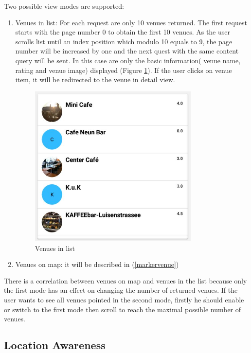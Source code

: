 Two possible view modes are supported:
 \begin{enumerate}
 	\item Venues in list: For each request are only 10 venues returned. The first request starts with the page number 0 to obtain the first 10 venues. As the user scrolls list until an index position which modulo 10 equals to 9, the page number will be increased by one and the next quest with the same content query will be sent. In this case are only the basic information( venue name, rating and venue image) displayed (Figure \ref{fig:venuesInlist}). If the user clicks on venue item, it will be redirected to the venue in detail view.
 	\begin{figure}[htbp]
 		\includegraphics[width=0.8\textwidth]{images/venuesonlist.jpg}
 		\centering
 		\caption{Venues in list}\label{fig:venuesInlist}
 	\end{figure}
 	\item Venues on map: it will be described in (\ref{markervenue})
 \end{enumerate}
There is a correlation between venues on map and venues in the list because only the first mode has an effect on changing the number of returned venues. If the user wants to see all venues pointed in the second mode, firstly he should enable or switch to the first mode then scroll to reach the maximal possible number of venues.

\subsection{Location Awareness}

